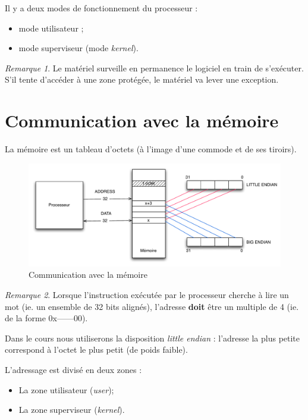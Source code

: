 \documentclass[11pt,english,french]{scrreprt}
\theoremstyle{remark}
\newtheorem*{rem*}{Remarque}
\theoremstyle{definition}
\begin{document}
\vspace{10pt}

Il y a deux modes de fonctionnement du processeur : \begin{itemize}
	\item mode utilisateur ;
	\item mode superviseur (mode \emph{kernel}).
\end{itemize}

\begin{rem*}
	Le matériel surveille en permanence le logiciel en train de s'exécuter. S'il tente d'accéder à une zone protégée, le matériel va lever une exception. 
\end{rem*}

\section{Communication avec la mémoire} %
La mémoire est un tableau d'octets (à l'image d'une commode et de ses tiroirs). 

\begin{figure}[!h]
	\center
	\includegraphics[scale=.5]{diagrammes/Memoire1}
	\caption{Communication avec la mémoire}
\end{figure}

\begin{rem*}
	Lorsque l'instruction exécutée par le processeur cherche à lire un mot (ie. un ensemble de 32 bits alignés), l'adresse \textbf{doit} être un multiple de 4 (ie. de la forme 0x------00).
	
	Dans le cours nous utiliserons la disposition \emph{little endian} : l'adresse la plus petite correspond à l'octet le plus petit (de poids faible).
\end{rem*}

L'adressage est divisé en deux zones :\begin{itemize}
	\item La zone utilisateur (\emph{user});
	\item La zone superviseur (\emph{kernel}).
\end{itemize}
\end{document}
